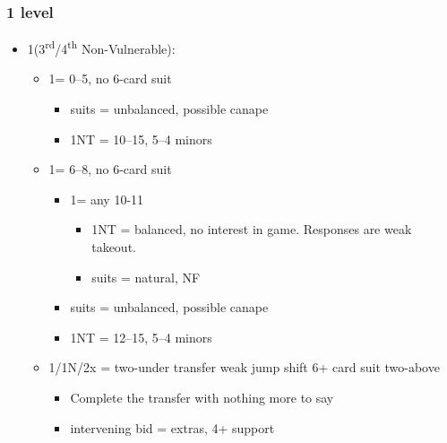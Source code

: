 \documentclass[a4paper,14pt]{extarticle}
\begin{document}
\subsubsection{1 level}
\label{sec:resp:1level}

\begin{itemize}
\label{note:13}
\item 1\clubs (3\textsuperscript{rd}/4\textsuperscript{th} Non-Vulnerable):
	\begin{itemize}
   \item 1\diamonds = 0--5, no 6-card suit
		\begin{itemize}
      \item suits = unbalanced, possible canape
      \item 1NT = 10--15, 5--4 minors
		\end{itemize}
   \item 1\hearts = 6--8, no 6-card suit
		\begin{itemize}
      \item 1\spades = any 10-11
			\begin{itemize}
			\item 1NT = balanced, no interest in game. Responses are weak takeout.
			\item suits = natural, NF
			\end{itemize}
      \item suits = unbalanced, possible canape
      \item 1NT = 12--15, 5--4 minors
		\end{itemize}
   \item 1\spades/1N/2x = two-under transfer weak jump shift 6+ card suit two-above
		\begin{itemize}
		\item Complete the transfer with nothing more to say
		\item intervening bid = extras, 4+ support
		\end{itemize}
	\end{itemize}

\newpage


\end{itemize}
\end{document}
